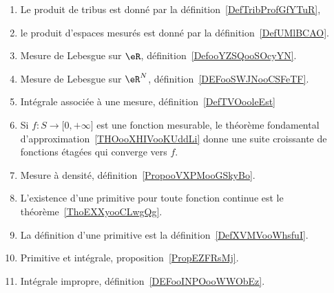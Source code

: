 
\begin{enumerate}
    \item Le produit de tribus est donné par la définition~\ref{DefTribProfGfYTuR},     %
    \item le produit d'espaces mesurés est donné par la définition~\ref{DefUMlBCAO}.     %
        \item
            Mesure de Lebesgue sur \( \eR\), définition~\ref{DefooYZSQooSOcyYN}.
        \item
            Mesure de Lebesgue sur \( \eR^N\), définition~\ref{DEFooSWJNooCSFeTF}.
        \item
            Intégrale associée à une mesure, définition~\ref{DefTVOooleEst}
        \item
            Si \( f\colon S\to \mathopen[ 0 , +\infty \mathclose]\) est une fonction mesurable, le théorème fondamental d'approximation~\ref{THOooXHIVooKUddLi} donne une suite croissante de fonctions étagées qui converge vers \( f\).
        \item
            Mesure à densité, définition~\ref{PropooVXPMooGSkyBo}.
    \item
        L'existence d'une primitive pour toute fonction continue est le théorème~\ref{ThoEXXyooCLwgQg}.
    \item
        La définition d'une primitive est la définition~\ref{DefXVMVooWhsfuI}.
    \item
        Primitive et intégrale, proposition~\ref{PropEZFRsMj}.
    \item
        Intégrale impropre, définition~\ref{DEFooINPOooWWObEz}.
\end{enumerate}
